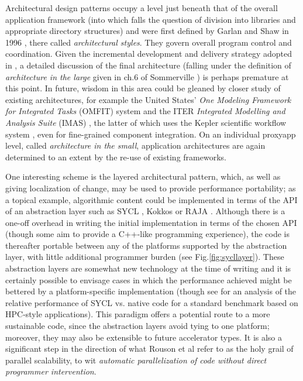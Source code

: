 Architectural design patterns occupy a level just beneath that of the overall
application framework (into which falls the question of division into
libraries and appropriate directory structures) and were first defined by
Garlan and Shaw in 1996 \cite{garlanshaw}, there called {\it architectural
styles}.  
They govern overall program control and coordination.  Given the incremental
development and delivery strategy adopted in \nep, a detailed discussion of
the final architecture (falling under the definition of {\it architecture in
the large} given in ch.6 of Sommerville \cite{sommerville}) is perhaps
premature at this point.  
In future, wisdom in this area could be gleaned by closer study of existing
architectures, for example the United States' {\it One Modeling Framework for
Integrated Tasks} (OMFIT) system \cite{omfitwebsite} and the ITER {\it
Integrated Modelling and Analysis Suite} (IMAS) \cite{Im15Desi}, the latter of
which uses the Kepler scientific workflow system \cite{keplerwebsite}, even
for fine-grained component integration.  
On an individual proxyapp level, called {\it architecture in the small},
application architectures are again determined to an extent by the re-use of
existing frameworks.

One interesting scheme is the layered architectural pattern, which, as well as
giving localization of change, may be used to provide performance portability;
as a topical example, algorithmic content could be implemented in terms of the
API of an abstraction layer such as SYCL \cite{syclwebsite}, Kokkos
\cite{kokkoswebsite} or RAJA \cite{rajawebsite}.  
Although there is a one-off overhead in writing the initial implementation in
terms of the chosen API (though some aim to provide a C++-like programming
experience), the code is thereafter portable between any of the platforms supported
by the abstraction layer, with little additional programmer burden (see
Fig.\ref{fig:sycllayer}).  
These abstraction layers are somewhat new technology at the time of writing
and it is certainly possible to envisage cases in which the performance achieved might
be bettered by a platform-specific implementation (though see
\cite{De20Eval} for an analysis of the relative performance of
SYCL vs. native code for a standard benchmark based on HPC-style
applications).  
This paradigm offers a potential route to a more sustainable code, since the
abstraction layers avoid tying to one platform; moreover, they may also be
extensible to future accelerator types.  
It is also a significant step in the direction of what Rouson et al
\cite{rousonxiaxu} refer to as the holy grail of parallel scalability, to wit
{\it automatic parallelization of code without direct programmer
intervention}.

